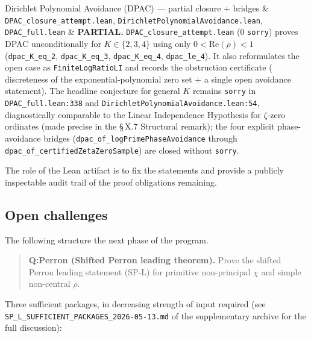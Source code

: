 {\begin{longtable}[]
Dirichlet Polynomial Avoidance (DPAC) --- partial closure + bridges & \texttt{DPAC\_closure\_attempt.lean}, \texttt{DirichletPolynomialAvoidance.lean}, \texttt{DPAC\_full.lean} & \textbf{PARTIAL.} \texttt{DPAC\_closure\_attempt.lean} (0 \texttt{sorry}) proves DPAC unconditionally for \(K \in \{2, 3, 4\}\) using only \(0 < \mathrm{Re}(\rho) < 1\) (\texttt{dpac\_K\_eq\_2}, \texttt{dpac\_K\_eq\_3}, \texttt{dpac\_K\_eq\_4}, \texttt{dpac\_le\_4}). It also reformulates the open case as \texttt{FiniteLogRatioLI} and records the obstruction certificate (\cite{Polya1913} discreteness of the exponential-polynomial zero set + a single open avoidance statement). The headline conjecture for general \(K\) remains \texttt{sorry} in \texttt{DPAC\_full.lean:338} and \texttt{DirichletPolynomialAvoidance.lean:54}, diagnostically comparable to the Linear Independence Hypothesis for \(\zeta\)-zero ordinates (made precise in the \S\,X.7 Structural remark); the four explicit phase-avoidance bridges (\texttt{dpac\_of\_logPrimePhaseAvoidance} through \texttt{dpac\_of\_certifiedZetaZeroSample}) are closed without \texttt{sorry}. \\
\end{longtable}
}

The role of the Lean artifact is to fix the statements and provide
a publicly inspectable audit trail of the proof obligations
remaining.

\subsection{Open challenges}

The following structure the next phase of the program.

\begin{quote}
\textbf{Q:Perron (Shifted Perron leading theorem).} Prove the shifted
Perron leading statement (SP-L) for primitive non-principal
\(\chi\) and simple non-central \(\rho\).
\end{quote}

Three sufficient packages, in decreasing strength of input
required (see \texttt{SP\_L\_SUFFICIENT\_PACKAGES\_2026-05-13.md} of the
supplementary archive for the full discussion):

